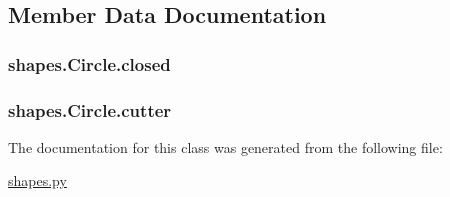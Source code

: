 \subsection{Member Data Documentation}
\hypertarget{classshapes_1_1_circle_ae6d4e9aa7838e819c3de731470657e4d}{}
\subsubsection[{closed}]{\setlength{\rightskip}{0pt plus 5cm}shapes.\+Circle.\+closed}\label{classshapes_1_1_circle_ae6d4e9aa7838e819c3de731470657e4d}
\hypertarget{classshapes_1_1_circle_ac35d8cbf4af1f68c39180ec9a326707c}{}
\subsubsection[{cutter}]{\setlength{\rightskip}{0pt plus 5cm}shapes.\+Circle.\+cutter}\label{classshapes_1_1_circle_ac35d8cbf4af1f68c39180ec9a326707c}


The documentation for this class was generated from the following file\+:\begin{DoxyCompactItemize}
\item 
\hyperlink{shapes_8py}{shapes.\+py}\end{DoxyCompactItemize}
